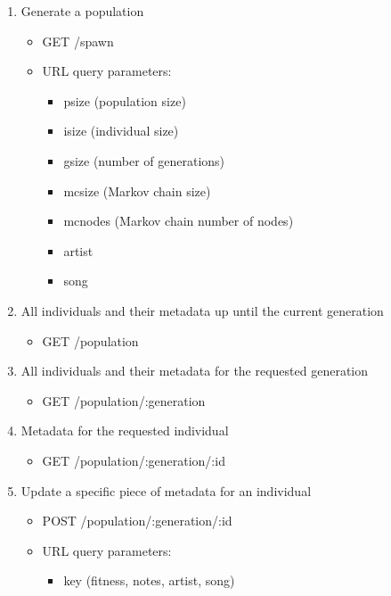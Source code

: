 \documentclass[12pt]{article} %
\begin{document}
\begin{enumerate}
\item Generate a population 
\begin{itemize}
\item GET /spawn
\item URL query parameters:
	\begin{itemize}
		\item psize (population size)
		\item isize (individual size)
		\item gsize (number of generations)
		\item mcsize (Markov chain size)
		\item mcnodes (Markov chain number of nodes)
		\item artist
		\item song
	\end{itemize}
\end{itemize}
\item All individuals and their metadata up until the current generation
\begin{itemize}
\item GET /population
\end{itemize}
\item All individuals and their metadata for the requested generation
\begin{itemize}
\item GET /population/:generation
\end{itemize}
\item Metadata for the requested individual
\begin{itemize}
\item GET /population/:generation/:id
\end{itemize}
\item Update a specific piece of metadata for an individual
\begin{itemize}
\item POST /population/:generation/:id
\item URL query parameters:
	\begin{itemize}
		\item key (fitness, notes, artist, song)
	\end{itemize}
\end{itemize}
\end{enumerate}

\end{document}
